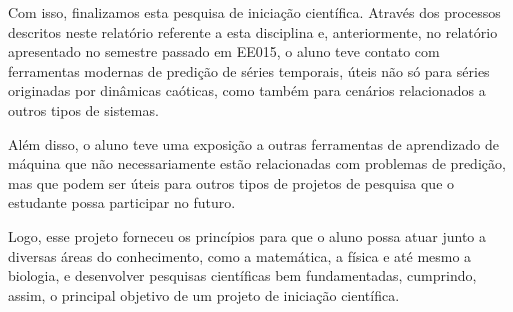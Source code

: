 \documentclass[a4paper, 12pt]{article}
\begin{document}
Com isso, finalizamos esta pesquisa de iniciação científica. Através dos processos descritos neste relatório referente a esta disciplina e, anteriormente, no relatório apresentado no semestre passado em EE015, o aluno teve contato com ferramentas modernas de predição de séries temporais, úteis não só para séries originadas por dinâmicas caóticas, como também para cenários relacionados a outros tipos de sistemas.

Além disso, o aluno teve uma exposição a outras ferramentas de aprendizado de máquina que não necessariamente estão relacionadas com problemas de predição, mas que podem ser úteis para outros tipos de projetos de pesquisa que o estudante possa participar no futuro.

Logo, esse projeto forneceu os princípios para que o aluno possa atuar junto a diversas áreas do conhecimento, como a matemática, a física e até mesmo a biologia, e desenvolver pesquisas científicas bem fundamentadas, cumprindo, assim, o principal objetivo de um projeto de iniciação científica.




{}

\end{document}

